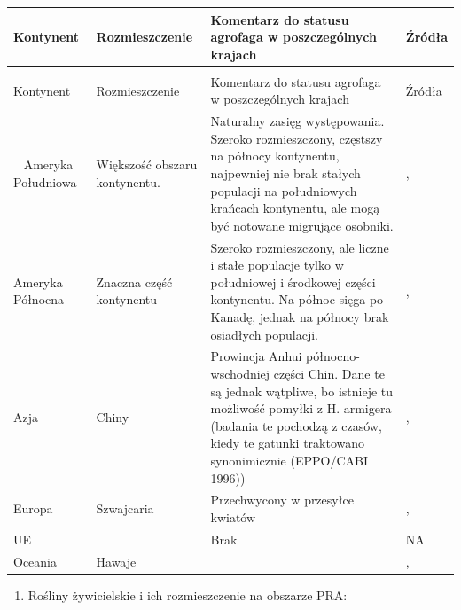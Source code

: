 \documentclass[polish,a4paper]{article}
\providecommand{\tightlist}{%
  \setlength{\itemsep}{0pt}\setlength{\parskip}{0pt}}
\begin{document}
\begin{longtabu} to 
\toprule
{}  \textbf{Kontynent} & \textbf{Rozmieszczenie} & \textbf{Komentarz do statusu agrofaga w poszczególnych krajach} & \textbf{Źródła}\\
\midrule
\endfirsthead
{}\\
\toprule
Kontynent & Rozmieszczenie & Komentarz do statusu agrofaga w poszczególnych krajach & Źródła\\
\midrule
\endhead
\
\endfoot
\bottomrule
\endlastfoot
Ameryka Południowa & Większość obszaru kontynentu. & Naturalny zasięg występowania. Szeroko rozmieszczony, częstszy na północy kontynentu, najpewniej nie brak stałych populacji na południowych krańcach kontynentu, ale mogą być notowane migrujące osobniki. & \citeauthor{eppo2018}, \hyperlink{ref-eppo2018}{\citeyear{eppo2018}}\\
Ameryka Północna & Znaczna część kontynentu & Szeroko rozmieszczony, ale liczne i stałe populacje tylko w południowej i środkowej części kontynentu. Na północ sięga po Kanadę, jednak na północy brak osiadłych populacji. & \citeauthor{eppo2018}, \hyperlink{ref-eppo2018}{\citeyear{eppo2018}}\\
Azja & Chiny & Prowincja Anhui północno-wschodniej części Chin. Dane te są jednak wątpliwe, bo istnieje tu możliwość pomyłki z H. armigera (badania te pochodzą z czasów, kiedy te gatunki traktowano synonimicznie (EPPO/CABI 1996)) & \citeauthor{luliang2002}, \hyperlink{ref-luliang2002}{\citeyear{luliang2002}}\\
Europa & Szwajcaria & Przechwycony w przesyłce kwiatów & \citeauthor{billen1984}, \hyperlink{ref-billen1984}{\citeyear{billen1984}}\\
UE &  & Brak & NA\\
\cmidrule{1-4}
Oceania & Hawaje &  & \citeauthor{purcell1992}, \hyperlink{ref-purcell1992}{\citeyear{purcell1992}}\\*
\end{longtabu}

\begin{enumerate}
\def\labelenumi{(\arabic{enumi})}
\setcounter{enumi}{6}
\tightlist
\item
  Rośliny żywicielskie i ich rozmieszczenie na obszarze PRA:
\end{enumerate}
\end{document}
